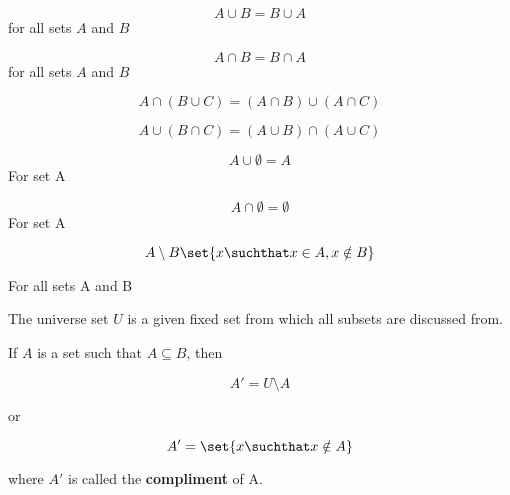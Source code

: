 \documentclass[20150903-160354-rs2.2-MarksMathNotebook.tex]{subfiles}
\begin{document}
\begin{property}
\[
A \cup B = B \cup A
\]
for all sets $A$ and $B$
\end{property}

\begin{property}
\[
A \cap B = B \cap A
\]
for all sets $A$ and $B$
\end{property}

\begin{property}

\[
A \cap (B \cup C) = (A \cap B) \cup (A \cap C)
\]

\end{property}

\begin{property}

\[
A \cup (B \cap C) = (A \cup B) \cap (A \cup C)
\]

\end{property}

\begin{property}

\[
A \cup \emptyset = A
\]
For set A
\end{property}

\begin{property}

\[
A \cap \emptyset = \emptyset
\]
For set A
\end{property}

\begin{definition}
\[
A \setminus B \set{x \suchthat x \in A, x \notin B}
\]

For all sets A and B
\end{definition}

\begin{definition}
The universe set $U$ is a given fixed set from which all subsets are discussed from.
\end{definition}

\begin{definition}
If $A$ is a set such that $A \subseteq B$, then

\[
A'=U \setminus A
\]

or

\[
A'=\set{x \suchthat x \notin A}
\]

where $A'$ is called the \textbf{compliment} of A.
\end{definition}
\end{document}
